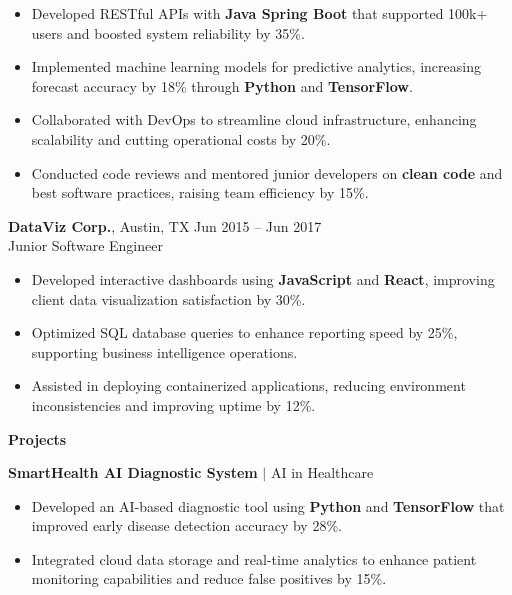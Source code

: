 \documentclass[a4paper,10pt]{article}
\begin{document}
\begin{itemize}[leftmargin=*]
    \item Developed RESTful APIs with \textbf{Java Spring Boot} that supported 100k+ users and boosted system reliability by 35\%.
    \item Implemented machine learning models for predictive analytics, increasing forecast accuracy by 18\% through \textbf{Python} and \textbf{TensorFlow}.
    \item Collaborated with DevOps to streamline cloud infrastructure, enhancing scalability and cutting operational costs by 20\%.
    \item Conducted code reviews and mentored junior developers on \textbf{clean code} and best software practices, raising team efficiency by 15\%.
\end{itemize}

\vspace{6pt}

\noindent
\textbf{DataViz Corp.}, Austin, TX \hfill Jun 2015 -- Jun 2017 \\
Junior Software Engineer

\begin{itemize}[leftmargin=*]
    \item Developed interactive dashboards using \textbf{JavaScript} and \textbf{React}, improving client data visualization satisfaction by 30\%.
    \item Optimized SQL database queries to enhance reporting speed by 25\%, supporting business intelligence operations.
    \item Assisted in deploying containerized applications, reducing environment inconsistencies and improving uptime by 12\%.
\end{itemize}

\vspace{12pt}

\noindent
\textbf{Projects}
\vspace{6pt}

\noindent
\textbf{SmartHealth AI Diagnostic System} $|$ AI in Healthcare \\
\begin{itemize}[leftmargin=*]
    \item Developed an AI-based diagnostic tool using \textbf{Python} and \textbf{TensorFlow} that improved early disease detection accuracy by 28\%.
    \item Integrated cloud data storage and real-time analytics to enhance patient monitoring capabilities and reduce false positives by 15\%.
\end{itemize}
\end{document}
